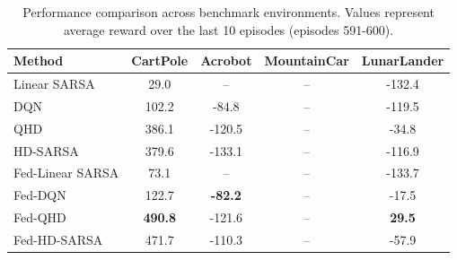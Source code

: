 \begin{table}[h]
    \centering
    \caption{Performance comparison across benchmark environments. Values represent average reward over the last 10 episodes (episodes 591-600).}
    \label{tab:main}
    \begin{tabular}{l|cccc}
        \toprule
        \textbf{Method} & \textbf{CartPole} & \textbf{Acrobot} & \textbf{MountainCar} & \textbf{LunarLander} \\
        \midrule
        Linear SARSA         & 29.0 & -- & -- & -132.4 \\
        DQN                  & 102.2 & -84.8 & -- & -119.5 \\
        QHD                  & 386.1 & -120.5 & -- & -34.8 \\
        HD-SARSA             & 379.6 & -133.1 & -- & -116.9 \\
        \midrule
        Fed-Linear SARSA     & 73.1 & -- & -- & -133.7 \\
        Fed-DQN              & 122.7 & \textbf{-82.2} & -- & -17.5 \\
        Fed-QHD              & \textbf{490.8} & -121.6 & -- & \textbf{29.5} \\
        Fed-HD-SARSA         & 471.7 & -110.3 & -- & -57.9 \\
        \bottomrule
    \end{tabular}
\end{table}
